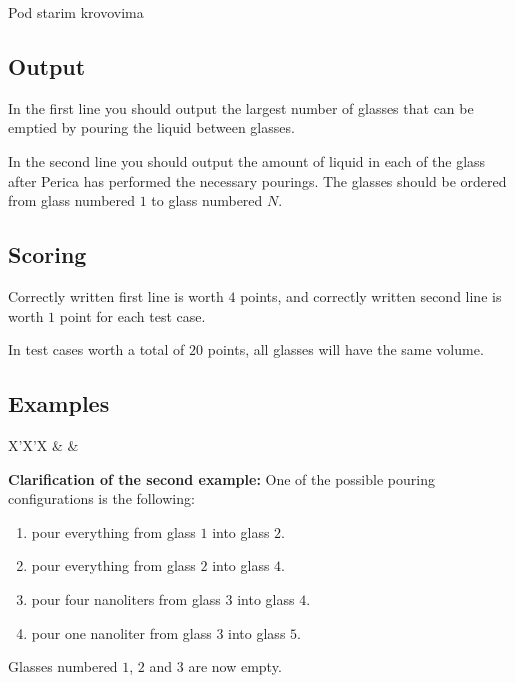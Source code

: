 \begin{statement}[
  problempoints=50,
  timelimit=1 second,
  memorylimit=512 MiB,
]{Pod starim krovovima}
\subsection*{Output}
In the first line you should output the largest number of glasses that
can be emptied by pouring the liquid between glasses.

In the second line you should output the amount of liquid in each of the
glass after Perica has performed the necessary pourings. The glasses should
be ordered from glass numbered $1$ to glass numbered $N$.

\subsection*{Scoring}
Correctly written first line is worth $4$ points, and correctly written second
line is worth $1$ point for each test case.

In test cases worth a total of $20$ points, all glasses will have the same
volume.

\subsection*{Examples}
\begin{tabularx}{\textwidth}{X'X'X}
 &
 &
\end{tabularx}

\textbf{Clarification of the second example:}
One of the possible pouring configurations is the following:
\begin{enumerate}
  \item pour everything from glass $1$ into glass $2$.
  \item pour everything from glass $2$ into glass $4$.
  \item pour four nanoliters from glass $3$ into glass $4$.
  \item pour one nanoliter from glass $3$ into glass $5$.
\end{enumerate}
Glasses numbered $1$, $2$ and $3$ are now empty.

\end{statement}

